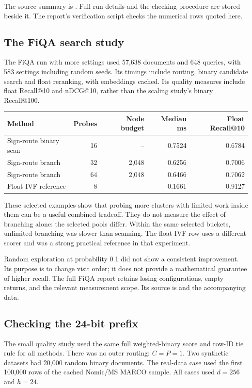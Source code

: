 The source summary is
. Full run details and the checking
procedure are stored beside it. The report's verification script checks the numerical rows quoted here.

\subsection{The FiQA search study}
The FiQA run with more settings used 57,638 documents and 648 queries, with 583 settings including random
seeds. Its timings include routing, binary candidate search and float reranking, with embeddings
cached. Its quality measures include float Recall@10 and nDCG@10, rather than the scaling study's
binary Recall@100.

\begin{center}\small
\begin{tabular}{@{}lrrrr@{}}\toprule
Method & Probes & Node budget & Median ms & Float Recall@10\\\midrule
Sign-route binary scan & 16 & -- & 0.7524 & 0.6784\\
Sign-route branch & 32 & 2,048 & 0.6256 & 0.7006\\
Sign-route branch & 64 & 2,048 & 0.6466 & 0.7062\\
Float IVF reference & 8 & -- & 0.1661 & 0.9127\\\bottomrule
\end{tabular}\normalsize\end{center}
These selected examples show that probing more clusters with limited work inside them can be
a useful combined tradeoff. They do not measure the effect of branching alone: the selected pools differ.
Within the same selected buckets, unlimited branching was slower than scanning. The float IVF
row uses a different scorer and was a strong practical reference in that experiment.

Random exploration at probability 0.1 did not show a consistent improvement. Its purpose is to
change visit order; it does not provide a mathematical guarantee of higher recall. The full
FiQA report retains losing configurations, empty returns, and the relevant measurement scope.
Its source is  and the accompanying data.

\subsection{Checking the 24-bit prefix}
The small quality study used the same full weighted-binary score and row-ID tie rule for all
methods. There was no outer routing: $C=P=1$. Two synthetic datasets had 20,000 random binary
documents. The real-data case used the first 100,000 rows of the cached Nomic/MS MARCO sample.
All cases used $d=256$ and $h=24$.

